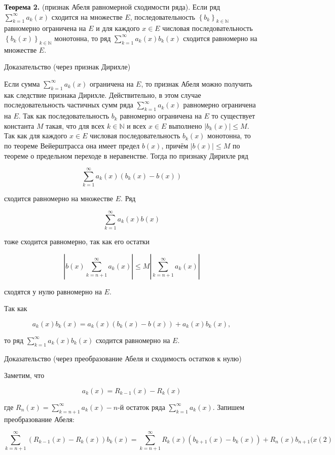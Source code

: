 \documentclass[a4paper,12pt]{article} %
\begin{document}
	\textbf{Теорема 2.} (признак Абеля равномерной сходимости ряда). Если ряд $\sum_{k=1}^{\infty} a_{k}(x)$ сходится на множестве $E$, последовательность $\left\{b_{k}\right\}_{k \in \mathbb{N}}$ равномерно ограничена на $E$ и для каждого $x \in E$ числовая последовательность $\left\{b_{k}(x)\right\}_{k \in \mathbb{N}}$ монотонна, то ряд $\sum_{k=1}^{\infty} a_{k}(x) b_{k}(x)$ сходится равномерно на множестве $E$.
	
	Доказательство (через признак Дирихле)
	
	Если сумма $\sum_{k=1}^{\infty} a_{k}(x)$ ограничена на $E$, то признак Абеля можно получить как следствие признака Дирихле. Действительно, в этом случае последовательность частичных сумм ряда $\sum_{k=1}^{\infty} a_{k}(x)$ равномерно ограничена на $E$. Так как последовательность $b_{k}$ равномерно ограничена на $E$ то существует константа $M$ такая, что для всех $k \in \mathbb{N}$ и всех $x \in E$ выполнено $\left|b_{k}(x)\right| \leq M$. Так как для каждого $x \in E$ числовая последовательность $b_{k}(x)$ монотонна, то по теореме Вейерштрасса она имеет предел $b(x)$, причём $|b(x)| \leq M$ по теореме о предельном переходе в неравенстве. Тогда по признаку Дирихле ряд
	
	$$
	\sum_{k=1}^{\infty} a_{k}(x)\left(b_{k}(x)-b(x)\right)
	$$
	
	сходится равномерно на множестве $E$. Ряд
	
	$$
	\sum_{k=1}^{\infty} a_{k}(x) b(x)
	$$
	
	тоже сходится равномерно, так как его остатки
	
	$$
	\left|b(x) \sum_{k=n+1}^{\infty} a_{k}(x)\right| \leq M\left|\sum_{k=n+1}^{\infty} a_{k}(x)\right|
	$$
	
	сходятся у нулю равномерно на $E$.
	
	Так как
	
	$$
	a_{k}(x) b_{k}(x)=a_{k}(x)\left(b_{k}(x)-b(x)\right)+a_{k}(x) b_{k}(x),
	$$
	
	то ряд $\sum_{k=1}^{\infty} a_{k}(x) b_{k}(x)$ сходится равномерно на $E$.
	
	Доказательство (через преобразование Абеля и сходимость остатков к нулю)
	
	Заметим, что
	
	$$
	a_{k}(x)=R_{k-1}(x)-R_{k}(x)
	$$
	
	где $R_{n}(x)=\sum_{k=n+1}^{\infty} a_{k}(x)-n$-й остаток ряда $\sum_{k=1}^{\infty} a_{k}(x)$. Запишем преобразование Абеля:
	
	$$
	\sum_{k=n+1}^{\infty}\left(R_{k-1}(x)-R_{k}(x)\right) b_{k}(x)=\sum_{k=n+1}^{\infty} R_{k}(x)\left(b_{k+1}(x)-b_{k}(x)\right)+R_{n}(x) b_{n+1}(x(2)
	$$
	
\end{document}

